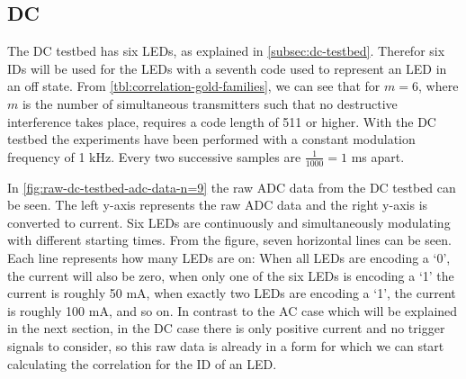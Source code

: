
\subsection{DC}
\label{subsec:dc-testbed-eval}

The DC testbed has six LEDs, as explained in \autoref{subsec:dc-testbed}.
Therefor six IDs will be used for the LEDs with a seventh code used to represent an LED in an off state.
From \autoref{tbl:correlation-gold-families}, we can see that for $m = 6$, where $m$ is the number of simultaneous transmitters such that no destructive interference takes place, requires a code length of 511 or higher.
With the DC testbed the experiments have been performed with a constant modulation frequency of 1 kHz.
Every two successive samples are $\frac{1}{1000} = 1$ ms apart.

In \autoref{fig:raw-dc-testbed-adc-data-n=9} the raw ADC data from the DC testbed can be seen.
The left y-axis represents the raw ADC data and the right y-axis is converted to current.
Six LEDs are continuously and simultaneously modulating with different starting times.
From the figure, seven horizontal lines can be seen.
Each line represents how many LEDs are on: When all LEDs are encoding a `0', the current will also be zero, when only one of the six LEDs is encoding a `1' the current is roughly 50 mA, when exactly two LEDs are encoding a `1', the current is roughly 100 mA, and so on.
In contrast to the AC case which will be explained in the next section, in the DC case there is only positive current and no trigger signals to consider, so this raw data is already in a form for which we can start calculating the correlation for the ID of an LED.

